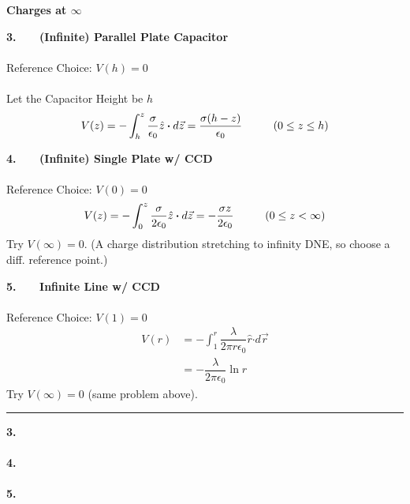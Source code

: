 \documentclass[12pt]{article}
\newcommand*{\dotP}{\boldsymbol \cdot}		%
\begin{document}
\newpage
\noindent \textbf{Charges at \(\infty\)}
\hfill \break \\
\begin{minipage}[t]{0.5\textwidth}
	\textbf{3. \ \ \ (Infinite) Parallel Plate Capacitor}\\ \\
	Reference Choice: \( V(h) = 0 \)\\ \\
	Let the Capacitor Height be \(h\) 
	\[ V( z ) = - \int_{h}^{z} \frac{\sigma}{\epsilon_0} \hat{z} \dotP d\vec{z}
		= \frac{\sigma (h-z)}{\epsilon_0} 
		\ \ \ \ \indent (0 \leq z \leq h)
	\]
	
	\hfill \break
	\textbf{4. \ \ \ (Infinite) Single Plate w/ CCD}\\ \\
	Reference Choice: \( V(0) = 0 \)
	\[ V( z ) = - \int_{0}^{z} \frac{\sigma}{2 \epsilon_0} \hat{z} \dotP d\vec{z}
		= - \frac{\sigma z}{2 \epsilon_0} 
		\ \ \ \ \indent (0 \leq z < \infty) 
	\]
	\hfill \break 
	Try \( V(\infty) = 0 \). (A charge distribution 
		stretching to infinity DNE, so choose a diff. reference point.)
	
	\hfill \break
	\textbf{5. \ \ \ Infinite Line w/ CCD}\\ \\
	Reference Choice: \( V(1) = 0 \)
	\begin{align*}
		V(r) &= - \int_{1}^{r} \dfrac{ \lambda }{2 \pi r \epsilon_0} \hat{r} \dotP d\vec{r} \\
		&= - \dfrac{ \lambda }{2 \pi \epsilon_0} \ln{r}
	\end{align*}
	\hfill \break
	Try \( V(\infty) = 0 \) (same problem above). \\	
\end{minipage}
\hspace{0.02\textwidth}
\rule[-438pt]{.5pt}{450pt}
\hspace{0.02\textwidth}
\begin{minipage}[t]{0.4\textwidth}
	\textbf{3. \ \ \ }\\ \\
	
	\hfill \break
	\textbf{4. \ \ \ }\\ \\

	\hfill \break
	\textbf{5. \ \ \ }\\ \\

\end{minipage}
\end{document}
